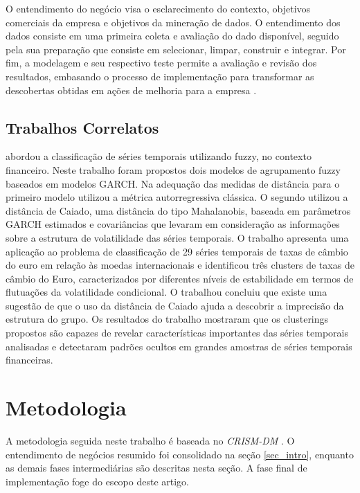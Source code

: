\documentclass[conference,compsoc]{IEEEtran}
\begin{document}
O entendimento do negócio visa o esclarecimento do contexto, objetivos comerciais da empresa e objetivos da mineração de dados. O entendimento dos dados consiste em uma primeira coleta e avaliação do dado disponível, seguido pela sua preparação que consiste em selecionar, limpar, construir e integrar. Por fim, a modelagem e seu respectivo teste permite a avaliação e revisão dos resultados, embasando o processo de implementação para transformar as descobertas obtidas em ações de melhoria para a empresa \cite{guia_crisp_dm}.

\subsection{Trabalhos Correlatos}

\citet{DUrso2013} abordou a classificação de séries temporais utilizando fuzzy, no contexto financeiro. Neste trabalho foram propostos dois modelos de agrupamento fuzzy baseados em modelos GARCH. Na adequação das medidas de distância para o primeiro modelo \citet{DUrso2013} utilizou a métrica autorregressiva clássica. O segundo utilizou a distância de Caiado, uma distância do tipo Mahalanobis, baseada em parâmetros GARCH estimados e covariâncias que levaram em consideração as informações sobre a estrutura de volatilidade das séries temporais. O trabalho apresenta uma aplicação ao problema de classificação de 29 séries temporais de taxas de câmbio do euro em relação às moedas internacionais e identificou três clusters de taxas de câmbio do Euro, caracterizados por diferentes níveis de estabilidade em termos de flutuações da volatilidade condicional. O trabalhou concluiu que existe uma sugestão de que o uso da distância de Caiado ajuda a descobrir a imprecisão da estrutura do grupo. Os resultados do trabalho mostraram que os clusterings propostos são capazes de revelar características importantes das séries temporais analisadas e detectaram padrões ocultos em grandes amostras de séries temporais financeiras.



\section{Metodologia}\label{sec_metod}

A metodologia seguida neste trabalho é baseada no \textit{CRISM-DM} \cite{guia_crisp_dm}. O entendimento de negócios resumido foi consolidado na seção \ref{sec_intro}, enquanto as demais fases intermediárias são descritas nesta seção. A fase final de implementação foge do escopo deste artigo.
\end{document}
